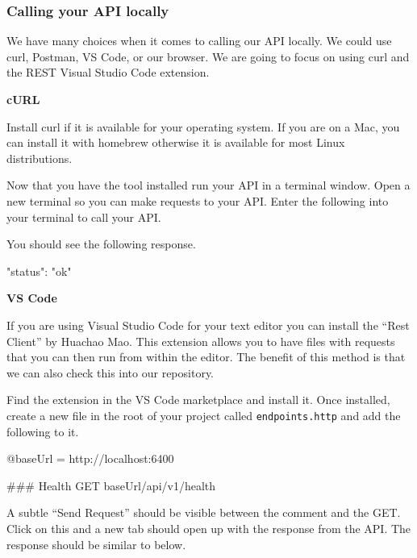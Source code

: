 \documentclass{csse4400}
\begin{document}
\subsubsection{Calling your API locally}

We have many choices when it comes to calling our API locally.
We could use curl, Postman, VS Code, or our browser.
We are going to focus on using curl and the REST Visual Studio Code extension.


\vspace{0.5em}
\noindent
\textbf{cURL}

Install curl if it is available for your operating system.
If you are on a Mac, you can install it with homebrew otherwise it is available for most Linux distributions.

Now that you have the tool installed run your API in a terminal window.
Open a new terminal so you can make requests to your API.
Enter the following into your terminal to call your API.


You should see the following response.

\begin{code}[language=json,numbers=none]{}
  {
    "status": "ok"
  }
\end{code}

\noindent
\textbf{VS Code}

If you are using Visual Studio Code for your text editor you can install the ``Rest Client'' by Huachao Mao.
This extension allows you to have files with requests that you can then run from  within the editor.
The benefit of this method is that we can also check this into our repository.

Find the extension in the VS Code marketplace and install it.
Once installed, create a new file in the root of your project called \texttt{endpoints.http} and add the following to it.

\begin{code}[numbers=none]{}
  @baseUrl = http://localhost:6400

  ### Health
  GET {{baseUrl}}/api/v1/health
\end{code}

A subtle ``Send Request'' should be visible between the comment and the GET.
Click on this and a new tab should open up with the response from the API.
The response should be similar to below.
\end{document}
